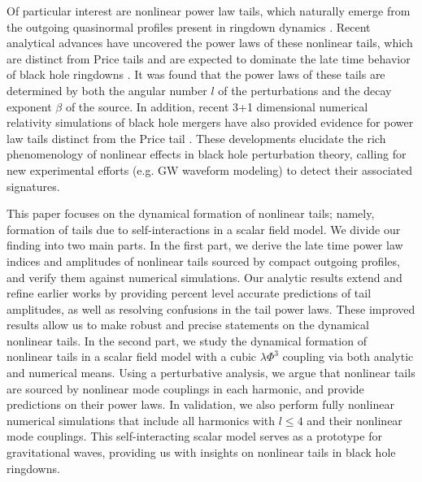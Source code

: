 \documentclass[reprint,aps,physrev,superscriptaddress,10pt,notitlepage,prd,nofootinbib,onecolumn]{revtex4-2}
\begin{document}
Of particular interest are nonlinear power law tails, which naturally emerge from the outgoing quasinormal profiles present in ringdown dynamics \cite{Okuzumi:2008ej,Lagos:2022otp}.
Recent analytical advances have uncovered the power laws of these nonlinear tails, which are distinct from Price tails and are expected to dominate the late time behavior of black hole ringdowns \cite{Cardoso:2024jme}.
It was found that the power laws of these tails are determined by both the angular number $l$ of the perturbations and the decay exponent $\beta$ of the source.
In addition, recent 3+1 dimensional numerical relativity simulations of black hole mergers have also provided evidence for power law tails distinct from the Price tail \cite{DeAmicis:2024eoy,Ma:2024hzq}.
These developments elucidate the rich phenomenology of nonlinear effects in black hole perturbation theory, calling for new experimental efforts (e.g. GW waveform modeling) to detect their associated signatures.


This paper focuses on the dynamical formation of nonlinear tails; namely, formation of tails due to self-interactions in a scalar field model.
We divide our finding into two main parts.
In the first part, we derive the late time power law indices and amplitudes of nonlinear tails sourced by compact outgoing profiles, and verify them against numerical simulations.
Our analytic results extend and refine earlier works \cite{Okuzumi:2008ej,Lagos:2022otp,Cardoso:2024jme} by providing percent level accurate predictions of tail amplitudes, as well as resolving confusions in the tail power laws.
These improved results allow us to make robust and precise statements on the dynamical nonlinear tails. %
In the second part, we study the dynamical formation of nonlinear tails in a scalar field model with a cubic $\lambda \Phi^3$ coupling via both analytic and numerical means.
Using a perturbative analysis, we argue that nonlinear tails are sourced by nonlinear mode couplings in each harmonic, and provide predictions on their power laws.
In validation, we also perform fully nonlinear numerical simulations that include all harmonics with $l \leq 4$ and their nonlinear mode couplings.
This self-interacting scalar model serves as a prototype for gravitational waves, providing us with insights on nonlinear tails in black hole ringdowns.
\end{document}
